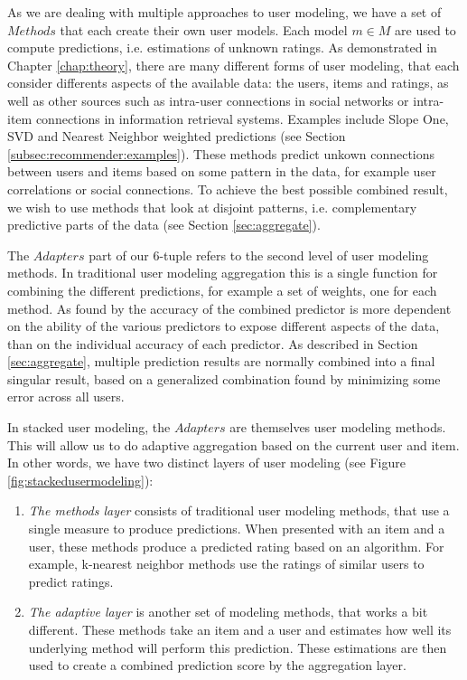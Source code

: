 As we are dealing with multiple approaches to user modeling, we have a set of $Methods$ that each create their own
user models. 
Each model $m \in M$ are used to compute predictions, i.e. estimations of unknown ratings.
As demonstrated in Chapter \ref{chap:theory}, there are many different forms of user modeling,
that each consider differents aspects of the available data: the users, items and ratings, as well as 
other sources such as intra-user connections in social networks or intra-item connections in information retrieval systems.
Examples include Slope One, SVD and Nearest Neighbor weighted predictions
(see Section \ref{subsec:recommender:examples}).
These methods predict unkown connections between users and items based on some pattern in the data,
for example user correlations or social connections.
To achieve the best possible combined result, we wish to use methods that look at disjoint patterns, 
i.e. complementary predictive parts of the data (see Section \ref{sec:aggregate}).

The $Adapters$ part of our 6-tuple refers to the second level of user modeling methods.
In traditional user modeling aggregation this is a single function for combining the different predictions,
for example a set of weights, one for each method.
As found by \citet[p6]{Bell2007} the accuracy of the combined predictor is more dependent on the 
ability of the various predictors to expose different aspects of the data, than on 
the individual accuracy of each predictor.
As described in Section \ref{sec:aggregate}, multiple prediction results are normally 
combined into a final singular result,
based on a generalized combination found by minimizing some error across all users.

In stacked user modeling, the $Adapters$ are themselves user modeling methods.
This will allow us to do adaptive aggregation based on the current user and item.
In other words, we have two distinct layers of user modeling 
(see Figure \ref{fig:stackedusermodeling}):

\begin{enumerate}
  \item
    \emph{The methods layer} consists of traditional user modeling methods, that use a single measure to produce predictions.
    When presented with an item and a user, these methods produce a predicted rating based on an algorithm.
    For example, k-nearest neighbor methods use the ratings of similar users to predict ratings.
  \item
    \emph{The adaptive layer} is another set of modeling methods, that works a bit different.
    These methods take an item and a user and estimates how well its underlying method
    will perform this prediction.
    These estimations are then used to create a combined prediction score by the aggregation layer.
    
\end{enumerate}

